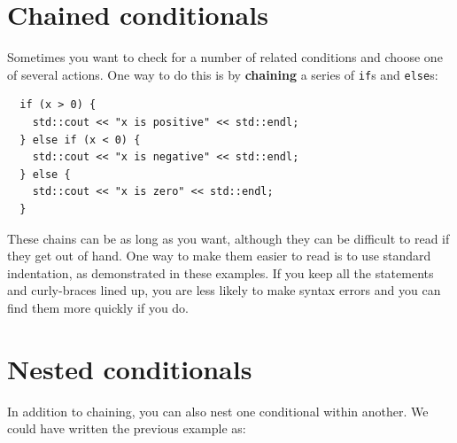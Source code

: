 \section {Chained conditionals}

Sometimes you want to check for a number of related conditions
and choose one of several actions.  One way to do this is by
{\bf chaining} a series of {\tt if}s and {\tt else}s:

\begin{lstlisting}
  if (x > 0) {
    std::cout << "x is positive" << std::endl;
  } else if (x < 0) {
    std::cout << "x is negative" << std::endl;
  } else {
    std::cout << "x is zero" << std::endl;
  }
\end{lstlisting}
%
These chains can be as long as you want, although they can
be difficult to read if they get out of hand.  One way to
make them easier to read is to use standard indentation,
as demonstrated in these examples.  If you keep all the
statements and curly-braces lined up, you are less
likely to make syntax errors and you can find them more
quickly if you do.

\section{Nested conditionals}

In addition to chaining, you can also nest one conditional
within another.  We could have written the previous example
as:

